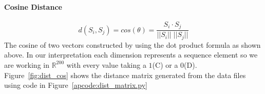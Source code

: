 \paragraph{Cosine Distance}
$$ d(S_i,S_j) = cos(\theta) = \frac{{S_i} \cdot {S_j}}{|| {S_i} || \; || {S_j} ||} $$
The cosine of two vectors constructed by using the dot product formula as shown above.
In our interpretation each dimension represents a sequence element so we are working in $\mathbb{R}^{200}$ with every value taking a $1$(C) or a $0$(D).
Figure~\ref{fig:dist_cos} shows the distance matrix generated from the data files using code in Figure~\ref{apcode:dist_matrix.py}

